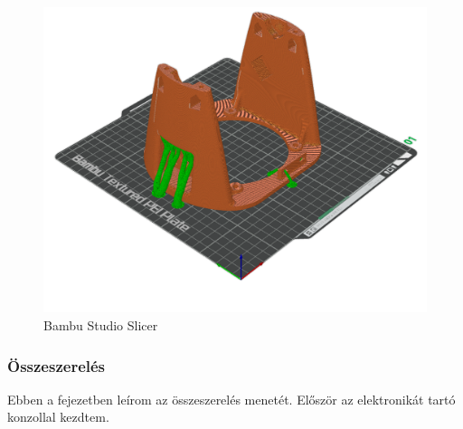 \documentclass[12pt,a4paper]{article}
\begin{document}
\begin{figure}[h!]
	\centering
	\includegraphics[width=.7\linewidth]{mech_bambustudio1} 
	\caption{Bambu Studio Slicer}
	\label{fig:mech_bambustudio1}
\end{figure}

\pagebreak
\subsubsection{Összeszerelés}

Ebben a fejezetben leírom az összeszerelés menetét. Először az elektronikát tartó konzollal kezdtem.
\end{document}
